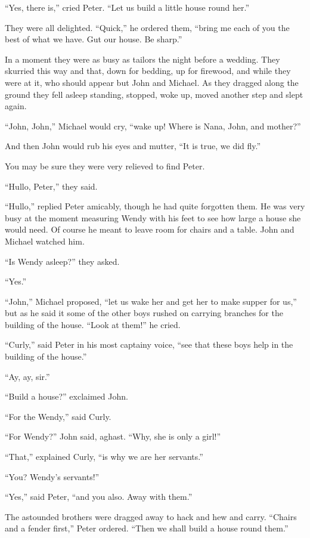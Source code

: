 ``Yes, there is,'' cried Peter. ``Let us build a little house round her.''

They were all delighted. ``Quick,'' he ordered them, ``bring me each of you the
best of what we have.
Gut our house.
Be sharp.''

In a moment they were as busy as tailors the night before a wedding.
They skurried this way and that, down for bedding, up for firewood, and while
they were at it, who should appear but John and Michael.
As they dragged along the ground they fell asleep standing, stopped, woke up,
moved another step and slept again.

``John, John,'' Michael would cry, ``wake up!
Where is Nana, John, and mother?''

And then John would rub his eyes and mutter, ``It is true, we did fly.''

You may be sure they were very relieved to find Peter.

``Hullo, Peter,'' they said.

``Hullo,'' replied Peter amicably, though he had quite forgotten them.
He was very busy at the moment measuring Wendy with his feet to see how large a
house she would need.
Of course he meant to leave room for chairs and a table.
John and Michael watched him.

``Is Wendy asleep?'' they asked.

``Yes.''

``John,'' Michael proposed, ``let us wake her and get her to make supper for
us,'' but as he said it some of the other boys rushed on carrying branches for
the building of the house.
``Look at them!'' he cried.

``Curly,'' said Peter in his most captainy voice, ``see that these boys help in
the building of the house.''

``Ay, ay, sir.''

``Build a house?'' exclaimed John.

``For the Wendy,'' said Curly.

``For Wendy?'' John said, aghast.
``Why, she is only a girl!''

``That,'' explained Curly, ``is why we are her servants.''

``You? Wendy's servants!''

``Yes,'' said Peter, ``and you also.
Away with them.''

The astounded brothers were dragged away to hack and hew and carry.
``Chairs and a fender first,'' Peter ordered.
``Then we shall build a house round them.''

